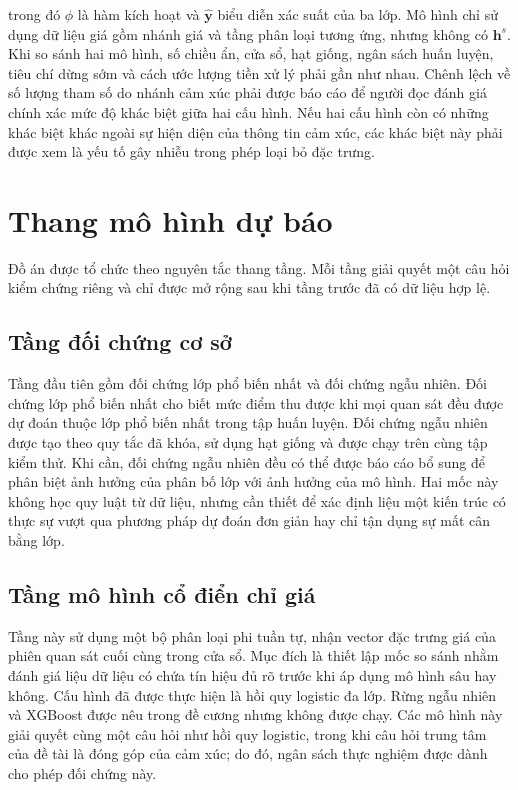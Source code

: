 \documentclass[12pt, a4paper, oneside]{report}
\begin{document}
trong đó $\phi$ là hàm kích hoạt và $\hat{\mathbf{y}}$ biểu diễn xác suất của ba lớp. Mô hình chỉ sử dụng dữ liệu giá gồm nhánh giá và tầng phân loại tương ứng, nhưng không có $\mathbf{h}^{s}$. Khi so sánh hai mô hình, số chiều ẩn, cửa sổ, hạt giống, ngân sách huấn luyện, tiêu chí dừng sớm và cách ước lượng tiền xử lý phải gần như nhau. Chênh lệch về số lượng tham số do nhánh cảm xúc phải được báo cáo để người đọc đánh giá chính xác mức độ khác biệt giữa hai cấu hình. Nếu hai cấu hình còn có những khác biệt khác ngoài sự hiện diện của thông tin cảm xúc, các khác biệt này phải được xem là yếu tố gây nhiễu trong phép loại bỏ đặc trưng.
\section{Thang mô hình dự báo}
\label{sec:pp-mo-hinh}

Đồ án được tổ chức theo nguyên tắc thang tầng. Mỗi tầng giải quyết
một câu hỏi kiểm chứng riêng và chỉ được mở rộng sau khi tầng trước đã có dữ liệu
hợp lệ.

\subsection{Tầng đối chứng cơ sở}

Tầng đầu tiên gồm đối chứng lớp phổ biến nhất và đối chứng ngẫu nhiên. Đối chứng lớp
phổ biến nhất cho biết mức điểm thu được khi mọi quan sát đều được dự đoán thuộc lớp
phổ biến nhất trong tập huấn luyện. Đối chứng ngẫu nhiên được tạo theo quy tắc đã
khóa, sử dụng hạt giống và được chạy trên cùng tập kiểm thử. Khi cần, đối chứng ngẫu
nhiên đều có thể được báo cáo bổ sung để phân biệt ảnh hưởng của phân bố lớp với ảnh
hưởng của mô hình. Hai mốc này không học quy luật từ dữ liệu, nhưng cần thiết để xác
định liệu một kiến trúc có thực sự vượt qua phương pháp dự đoán đơn giản hay chỉ tận dụng sự mất cân bằng lớp.

\subsection{Tầng mô hình cổ điển chỉ giá}

Tầng này sử dụng một bộ phân loại phi tuần tự, nhận vector đặc trưng giá của phiên
quan sát cuối cùng trong cửa sổ. Mục đích là thiết lập mốc so sánh nhằm đánh giá liệu
dữ liệu có chứa tín hiệu đủ rõ trước khi áp dụng mô hình sâu hay không. Cấu hình đã
được thực hiện là hồi quy logistic đa lớp. Rừng ngẫu nhiên và XGBoost được nêu trong
đề cương nhưng không được chạy. Các mô hình này giải quyết cùng một câu hỏi như hồi
quy logistic, trong khi câu hỏi trung tâm của đề tài là đóng góp của cảm xúc; do đó,
ngân sách thực nghiệm được dành cho phép đối chứng này.
\end{document}
